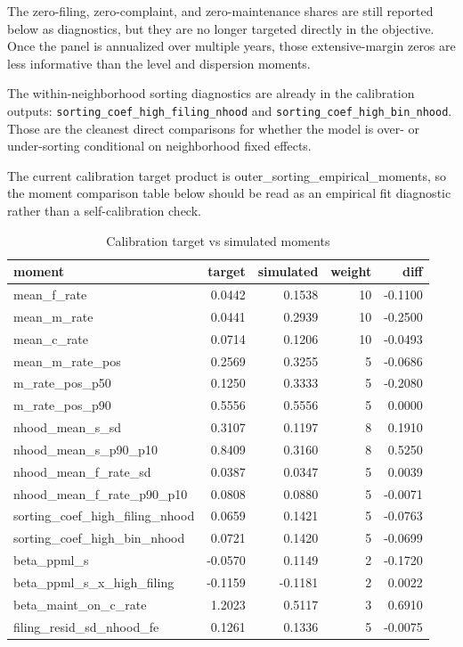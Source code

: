 \documentclass[
  11pt,
]{article}
\begin{document}
The zero-filing, zero-complaint, and zero-maintenance shares are still
reported below as diagnostics, but they are no longer targeted directly
in the objective. Once the panel is annualized over multiple years,
those extensive-margin zeros are less informative than the level and
dispersion moments.

The within-neighborhood sorting diagnostics are already in the
calibration outputs: \texttt{sorting\_coef\_high\_filing\_nhood} and
\texttt{sorting\_coef\_high\_bin\_nhood}. Those are the cleanest direct
comparisons for whether the model is over- or under-sorting conditional
on neighborhood fixed effects.

The current calibration target product is
outer\_sorting\_empirical\_moments, so the moment comparison table below
should be read as an empirical fit diagnostic rather than a
self-calibration check.

\begin{table}

\caption{Calibration target vs simulated moments}
\centering
\begin{tabular}[t]{lrrrr}
\toprule
moment & target & simulated & weight & diff\\
\midrule
mean\_f\_rate & 0.0442 & 0.1538 & 10 & -0.1100\\
mean\_m\_rate & 0.0441 & 0.2939 & 10 & -0.2500\\
mean\_c\_rate & 0.0714 & 0.1206 & 10 & -0.0493\\
mean\_m\_rate\_pos & 0.2569 & 0.3255 & 5 & -0.0686\\
m\_rate\_pos\_p50 & 0.1250 & 0.3333 & 5 & -0.2080\\
m\_rate\_pos\_p90 & 0.5556 & 0.5556 & 5 & 0.0000\\
nhood\_mean\_s\_sd & 0.3107 & 0.1197 & 8 & 0.1910\\
nhood\_mean\_s\_p90\_p10 & 0.8409 & 0.3160 & 8 & 0.5250\\
nhood\_mean\_f\_rate\_sd & 0.0387 & 0.0347 & 5 & 0.0039\\
nhood\_mean\_f\_rate\_p90\_p10 & 0.0808 & 0.0880 & 5 & -0.0071\\
sorting\_coef\_high\_filing\_nhood & 0.0659 & 0.1421 & 5 & -0.0763\\
sorting\_coef\_high\_bin\_nhood & 0.0721 & 0.1420 & 5 & -0.0699\\
beta\_ppml\_s & -0.0570 & 0.1149 & 2 & -0.1720\\
beta\_ppml\_s\_x\_high\_filing & -0.1159 & -0.1181 & 2 & 0.0022\\
beta\_maint\_on\_c\_rate & 1.2023 & 0.5117 & 3 & 0.6910\\
filing\_resid\_sd\_nhood\_fe & 0.1261 & 0.1336 & 5 & -0.0075\\
\bottomrule
\end{tabular}
\end{table}
\end{document}
